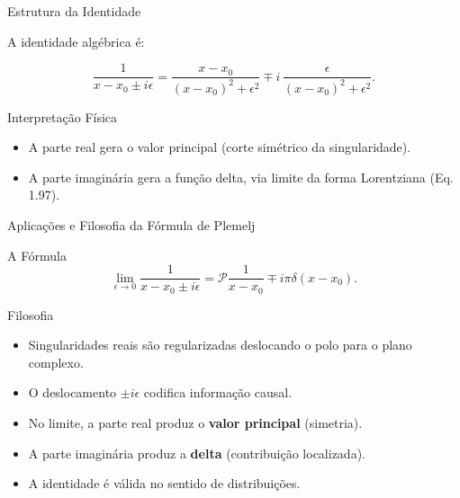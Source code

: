 \documentclass[aspectratio=169]{beamer}
\begin{document}
\begin{frame}{Estrutura da Identidade}

A identidade algébrica é:

\begin{equation}
\frac{1}{x-x_0 \pm i\epsilon}
=
\frac{x-x_0}{(x-x_0)^2+\epsilon^2}
\mp
i\,\frac{\epsilon}{(x-x_0)^2+\epsilon^2}.
\tag{1.106}
\end{equation}

\begin{block}{Interpretação Física}
\begin{itemize}
\item A parte real gera o valor principal
      (corte simétrico da singularidade).
\item A parte imaginária gera a função delta,
      via limite da forma Lorentziana (Eq. 1.97).
\end{itemize}
\end{block}

\end{frame}

\begin{frame}{Aplicações e Filosofia da Fórmula de Plemelj}

\begin{block}{A Fórmula}
\[
\lim_{\epsilon\to 0}
\frac{1}{x-x_0 \pm i\epsilon}
=
\mathcal{P}\frac{1}{x-x_0}
\mp i\pi \delta(x-x_0).
\]
\end{block}


\begin{block}{Filosofia}
\begin{itemize}
\item Singularidades reais são regularizadas deslocando o polo para o plano complexo.
\item O deslocamento $\pm i\epsilon$ codifica informação causal.
\item No limite, a parte real produz o \textbf{valor principal} (simetria).
\item A parte imaginária produz a \textbf{delta} (contribuição localizada).
\item A identidade é válida no sentido de distribuições.
\end{itemize}
\end{block}

\end{frame}
\end{document}
